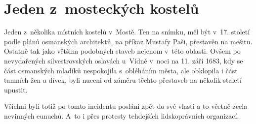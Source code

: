
\chapter{Jeden z~mosteckých kostelů}

Jeden z~několika místních kostelů v~Mostě. Ten na snímku, měl být v~17. století
podle plánů osmanských architektů, na příkaz Mustafy Paši, přestavěn na mešitu.
Ostatně tak jako většina podobných staveb nejenom v~této oblasti. Ovšem po
nevydařených silvestrovských oslavách u~Vídně v~noci na 11. září 1683, kdy se
část osmanských mladíků nespokojila s~obléháním města, ale obklopila i část
tamních žen a dívek, byli nuceni od záměru těchto přestaveb na několik staletí
upustit.

Všichni byli totiž po tomto incidentu posláni zpět do své vlasti a to včetně
zcela nevinných eunuchů. A~to i přes protesty tehdejších lidskoprávních
organizací.


